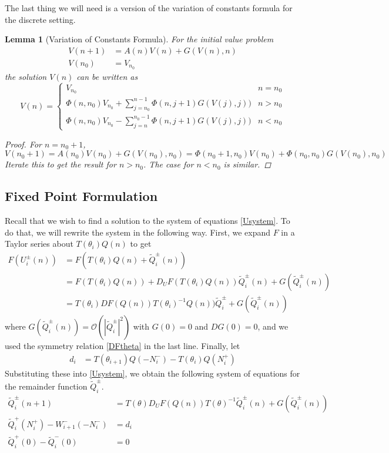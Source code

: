 \documentclass[12pt]{article}
\newtheorem{lemma}{Lemma}
\begin{document}
The last thing we will need is a version of the variation of constants formula for the discrete setting.

\begin{lemma}[Variation of Constants Formula]\label{VOC}
For the initial value problem
\begin{align*}
V(n+1) &= A(n) V(n) + G(V(n), n) \\
V(n_0) &= V_{n_0}
\end{align*}
the solution $V(n)$ can be written as 
\begin{equation}\label{VOCformula}
V(n) = 
\begin{cases}
V_{n_0} & n = n_0 \\
\Phi(n, n_0) V_{n_0} + \sum_{j = n_0}^{n-1} \Phi(n, j+1) G(V(j), j)) & n > n_0 \\
\Phi(n, n_0) V_{n_0} - \sum_{j = n}^{n_0-1} \Phi(n, j+1) G(V(j), j)) & n < n_0 
\end{cases}
\end{equation}
\begin{proof}
For $n = n_0 + 1$,
\[
V(n_0 + 1) = A(n_0) V(n_0) + G(V(n_0), n_0) = \Phi(n_0+1, n_0) V(n_0) + \Phi(n_0, n_0) G(V(n_0), n_0)
\]
Iterate this to get the result for $n > n_0$. The case for $n < n_0$ is similar.
\end{proof}
\end{lemma}

\subsection{Fixed Point Formulation}

Recall that we wish to find a solution to the system of equations \eqref{Usystem}. To do that, we will rewrite the system in the following way. First, we expand $F$ in a Taylor series about $T(\theta_i) Q(n)$ to get
\begin{align*}
F(U_i^\pm(n)) &= F(T(\theta_i) Q(n) + \tilde{Q}_i^\pm(n)) \\
&= F(T(\theta_i) Q(n)) + D_U F(T(\theta_i) Q(n)) \tilde{Q}_i^\pm(n) + G(\tilde{Q}_i^\pm(n)) \\
&= T(\theta_i)DF(Q(n))T(\theta_i)^{-1} Q(n)) \tilde{Q}_i^\pm + G(\tilde{Q}_i^\pm(n))
\end{align*}
where $G(\tilde{Q}_i^\pm(n)) = \mathcal{O}(|\tilde{Q}_i^\pm|^2)$ with $G(0) = 0$ and $DG(0) = 0$, and we used the symmetry relation \eqref{DFtheta} in the last line. Finally, let
\begin{align} \label{didef}
d_i &= T(\theta_{i+1}) Q(-N_i^-) - T(\theta_i) Q(N_i^+)
\end{align}
Substituting these into \eqref{Usystem}, we obtain the following system of equations for the remainder function $\tilde{Q}_i^\pm$.
\begin{align}
\tilde{Q}_i^\pm(n+1) &= T(\theta)D_U F(Q(n))T(\theta)^{-1} \tilde{Q}_i^\pm(n) + G(\tilde{Q}_i^\pm(n)) \label{Wsystem1} \\
\tilde{Q}_i^+(N_i^+) - W_{i+1}^-(-N_i^-) &= d_i \label{Wsystem2} \\
\tilde{Q}_i^+(0) - \tilde{Q}_i^-(0) &= 0 \label{Wsystem3}
\end{align}
\end{document}
